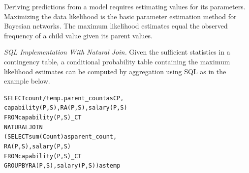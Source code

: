 \documentclass{IEEEtran}
\begin{document}
Deriving predictions from a model requires estimating values for its parameters.  Maximizing the data likelihood is the basic parameter estimation method for Bayesian networks. The maximum likelihood estimates equal the observed frequency of a child value given its parent values.

{\em SQL Implementation With Natural Join.} Given the sufficient statistics in a contingency table, a conditional probability table containing the maximum likelihood estimates can be computed by aggregation using SQL as in the example below. 

\begin{alltt}
SELECT count/temp.parent\_count as CP, 
capability(P,S), RA(P,S), salary(P,S) 
FROM capability(P,S)\_CT 
NATURAL JOIN  
(SELECT sum(Count) as parent\_count, 
RA(P,S), salary(P,S) 
FROM capability(P,S)\_CT  
GROUP BY  RA(P,S), salary(P,S) ) as temp
\end{alltt}


%
%
\end{document}

